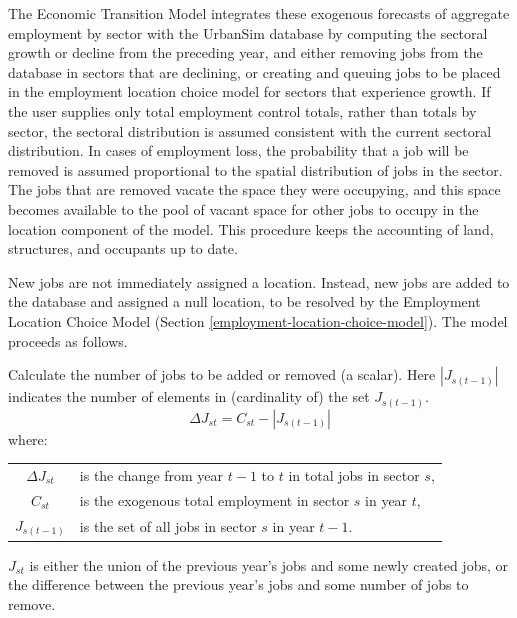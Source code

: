 \documentclass[fleqn]{article}
\begin{document}
The Economic Transition Model integrates these exogenous forecasts
of aggregate employment by sector with the UrbanSim database by
computing the sectoral growth or decline from the preceding year,
and either removing jobs from the database in sectors that are
declining, or creating and queuing jobs to be placed in the employment
location choice model for sectors that experience growth.  If the user
supplies only total employment control totals, rather than totals
by sector, the sectoral distribution is assumed consistent with
the current sectoral distribution. In cases of employment loss,
the probability that a job will be removed is assumed proportional
to the spatial distribution of jobs in the sector.  The jobs that
are removed vacate the space they were occupying, and this space
becomes available to the pool of vacant space for other jobs to
occupy in the location component of the model.  This procedure
keeps the accounting of land, structures, and occupants up to
date.

New jobs are not immediately assigned a location.  Instead, new
jobs are added to the database and assigned a null location, to be
resolved by the Employment Location Choice Model
(Section \ref{employment-location-choice-model}).
The model proceeds as follows.

Calculate the number of jobs to be added or removed (a scalar).
Here $|J_{s(t-1)}|$ indicates the number of elements in
(cardinality of) the set $J_{s(t-1)}$.
\begin{equation}
\Delta J_{st} = C_{st} - |J_{s(t-1)}|
\end{equation}
where:
\begin{center}
\begin{tabular}{c p{5.5in}}
$\Delta J_{st}$ & is the change from year $t-1$ to $t$ in total jobs in sector $s$,\\
$C_{st}$ & is the exogenous total employment in sector $s$ in year $t$,\\
$J_{s(t-1)}$ & is the set of all jobs in sector $s$ in year $t-1$.\\
\end{tabular}
\end{center}

$J_{st}$ is either the union of the previous year's jobs and some newly
created jobs, or the difference between the previous year's jobs and some
number of jobs to remove.
\end{document}
